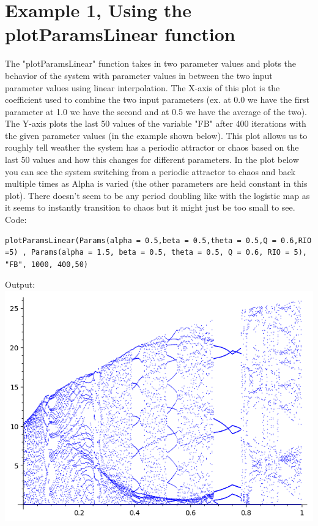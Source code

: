 \documentclass{article}
\begin{document}
\section*{Example 1, Using the plotParamsLinear function}
The "plotParamsLinear" function takes in two parameter values and plots the behavior of the system with parameter values in between the two input parameter values using linear interpolation.
The X-axis of this plot is the coefficient used to combine the two input parameters (ex. at 0.0 we have the first parameter at 1.0 we have the second and at 0.5 we have the average of the two).
The Y-axis plots the last 50 values of the variable "FB" after 400 iterations with the given parameter values (in the example shown below). 
This plot allows us to roughly tell weather the system has a periodic attractor or chaos based on the last 50 values and how this changes for different parameters.
In the plot below you can see the system switching from a periodic attractor to chaos and back multiple times as Alpha is varied (the other parameters are held constant in this plot).
There doesn't seem to be any period doubling like with the logistic map as it seems to instantly transition to chaos but it might just be too small to see.
\linebreak
Code:
\begin{lstlisting}
plotParamsLinear(Params(alpha = 0.5,beta = 0.5,theta = 0.5,Q = 0.6,RIO =5) , Params(alpha = 1.5, beta = 0.5, theta = 0.5, Q = 0.6, RIO = 5), "FB", 1000, 400,50)
\end{lstlisting}
Output:
\linebreak
\includegraphics[scale=1.0]{example3_1.png}
\end{document}
